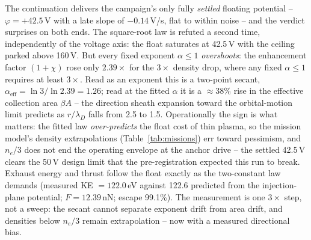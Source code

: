 \documentclass[11pt]{article}
\begin{document}
The continuation delivers the campaign's only fully \emph{settled}
floating potential -- $\varphi = +42.5$\,V with a late slope of
$-0.14$\,V/\textmu s, flat to within noise -- and the verdict surprises
on both ends. The square-root law is refuted a second time,
independently of the voltage axis: the float saturates at 42.5\,V with
the ceiling parked above 160\,V. But every fixed exponent
$\alpha \le 1$ \emph{overshoots}: the enhancement factor $(1+\chi)$ rose
only $2.39\times$ for the $3\times$ density drop, where any fixed
$\alpha \le 1$ requires at least $3\times$. Read as an exponent this is
a two-point secant, $\alpha_{\mathrm{eff}} = \ln 3/\ln 2.39 = 1.26$;
read at the fitted $\alpha$ it is a $\approx$38\% rise in the effective
collection area $\beta A$ -- the direction sheath expansion toward the
orbital-motion limit predicts as $r/\lambda_D$ falls from 2.5 to 1.5.
Operationally the sign is what matters: the fitted law
\emph{over-predicts} the float cost of thin plasma, so the mission
model's density extrapolations (Table~\ref{tab:missions}) err toward
pessimism, and $n_e/3$ does not end the operating envelope at the anchor
drive -- the settled 42.5\,V clears the 50\,V design limit that the
pre-registration expected this run to break. Exhaust energy and thrust
follow the float exactly as the two-constant law demands (measured KE
$= 122.0$\,eV against 122.6 predicted from the injection-plane
potential; $F = 12.39$\,nN; escape 99.1\%). The measurement is one
$3\times$ step, not a sweep: the secant cannot separate exponent drift
from area drift, and densities below $n_e/3$ remain extrapolation --
now with a measured directional bias.
\end{document}
